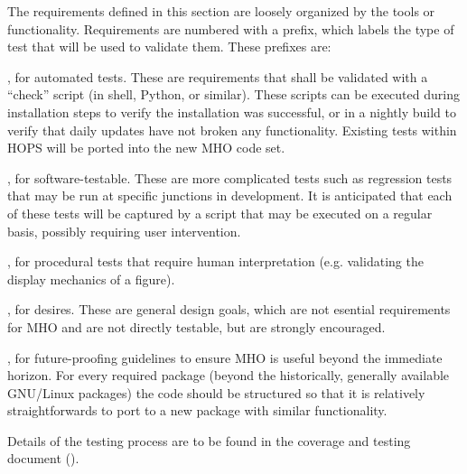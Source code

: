 The requirements defined in this section are loosely organized by the tools
or functionality.  Requirements are numbered with a prefix, which labels 
the type of test that will be used to validate them.  These prefixes are:
\begin{description}
[align=left, labelwidth=0.0cm, leftmargin=1cm]
\item[A], for automated tests. These are requirements
that shall be validated with a ``check'' script (in shell, Python, or similar).
These scripts can be executed during installation steps to verify the 
installation was successful, 
or in a nightly build to verify that daily updates have not broken any 
functionality. Existing tests within \ac{HOPS} will be ported into the new 
\ac{MHO} code set.

\item[S], for software-testable. These are more complicated tests such as 
regression tests that may be run at specific junctions in development. It is 
anticipated  that each of these tests will be captured by a script that may 
be executed on a regular basis, possibly requiring user intervention.  

\item[P], for procedural tests that require human interpretation (e.g. validating
the display mechanics of a figure). 

\item[D], for desires. These are general design goals, which are not 
esential requirements for \acs{MHO} and are not directly testable, 
but are strongly encouraged.

\item[F], for future-proofing guidelines to ensure \acs{MHO} is useful beyond
the immediate horizon. For every required package (beyond the historically, 
generally available GNU/Linux packages) the code should be structured 
so that it is relatively straightforwards to port to a new package with
similar functionality.

Details of the testing process are to be found in the coverage
and testing document (\cite{cover}).

\end{description}


